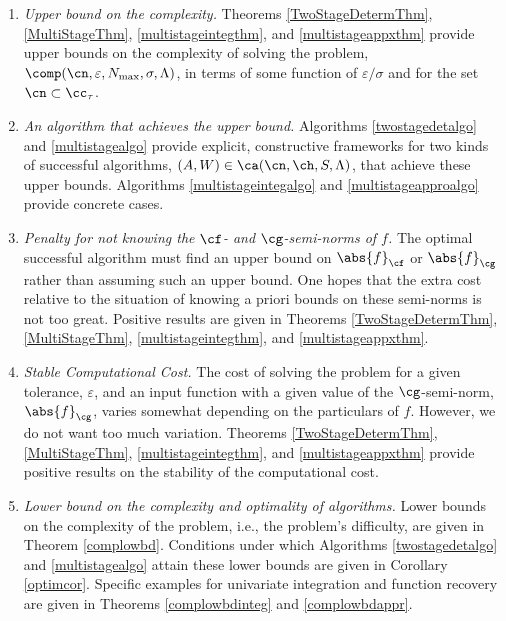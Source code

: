 \documentclass[]{elsarticle}
\theoremstyle{definition}
\theoremstyle{remark}
\newcommand{\Fnorm}[1]{\abs{#1}_{\cf}}
\newcommand{\Gnorm}[1]{\abs{#1}_{\cg}}
\begin{document}
\begin{enumerate}

\renewcommand{\labelenumi}{\roman{enumi}.}

\item \emph{Upper bound on the complexity.}
Theorems \ref{TwoStageDetermThm}, \ref{MultiStageThm}, \ref{multistageintegthm}, and \ref{multistageappxthm} provide upper bounds on the complexity of solving the problem, $\comp(\cn,\varepsilon,N_{\max},\sigma,\Lambda)$, in terms of some function of $\varepsilon/\sigma$ and for the set $\cn \subset \cc_{\tau}$.

\item \emph{An algorithm that achieves the upper bound.}  Algorithms \ref{twostagedetalgo} and \ref{multistagealgo} provide explicit, constructive frameworks for two kinds of successful algorithms, $(A,W) \in \ca(\cn,\ch,S,\Lambda)$, that achieve these upper bounds.  Algorithms \ref{multistageintegalgo} and \ref{multistageapproalgo} provide concrete cases.

\item \emph{Penalty for not knowing the $\cf$- and $\cg$-semi-norms of $f$.} The optimal successful algorithm must find an upper bound on $\Fnorm{f}$ or $\Gnorm{f}$ rather than assuming such an upper bound.  One hopes that the extra cost relative to the situation of knowing a priori bounds on these semi-norms is not too great.  Positive results are given in Theorems  \ref{TwoStageDetermThm}, \ref{MultiStageThm}, \ref{multistageintegthm}, and \ref{multistageappxthm}.

\item \emph{Stable Computational Cost.}  The cost of solving the problem for a given tolerance, $\varepsilon$, and an input function with a given value of the $\cg$-semi-norm, $\Gnorm{f}$, varies somewhat depending on the particulars of $f$.  However, we do not want too much variation.  Theorems  \ref{TwoStageDetermThm}, \ref{MultiStageThm}, \ref{multistageintegthm}, and \ref{multistageappxthm} provide positive results on the stability of the computational cost.

\item \emph{Lower bound on the complexity and optimality of algorithms.}  Lower bounds on the complexity of the problem, i.e., the problem's difficulty, are given in Theorem \ref{complowbd}.  Conditions under which Algorithms \ref{twostagedetalgo} and \ref{multistagealgo} attain these lower bounds are given in Corollary \ref{optimcor}.  Specific examples for univariate integration and function recovery are given in Theorems \ref{complowbdinteg} and \ref{complowbdappr}.

\end{enumerate}
\end{document}
